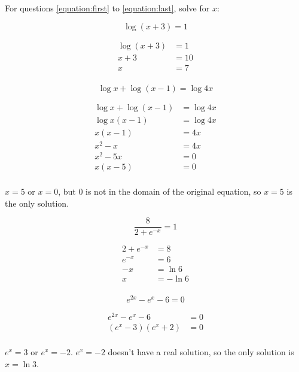\documentclass[fleqn,addpoints]{exam}
\begin{document}
\begin{questions}
For questions \ref{equation:first} to \ref{equation:last}, solve for $x$:

\question[5]
\label{equation:first}
\[
  \log(x+3) = 1
\]
\begin{solution}[2 cm]

\begin{align*}
  \log(x+3) &= 1 \\
  x + 3 &= 10 \\
  x &= 7 \\
\end{align*}

\end{solution}

\question[7]
\[
  \log x + \log (x-1) = \log 4x
\]
\begin{solution}[3 cm]
\begin{align*}
  \log x + \log (x-1) &= \log 4x \\
  \log x(x-1) &= \log 4x \\
  x(x-1) &= 4x \\
  x^2-x &= 4x \\
  x^2-5x &= 0 \\
  x(x-5) &= 0 \\
\end{align*}

$x=5$ or $x=0$, but 0 is not in the domain of the original equation, so $x=5$ is the only solution.

\end{solution}

\question[8]
\[ 
  \frac{8}{2+e^{-x}} = 1
\]
\begin{solution}[4 cm]
\begin{align*}
  2+e^{-x} &= 8 \\ 
  e^{-x} &= 6 \\
  -x &= \ln 6 \\
  x &= -\ln 6 \\
\end{align*}

\end{solution}

\question[10]
\label{equation:last}
\[
  e^{2x} - e^x - 6 = 0
\]
\begin{solution}[4 cm]
\begin{align*}
  e^{2x} - e^x - 6 &= 0 \\
  (e^x - 3)(e^x + 2) &= 0 \\
\end{align*}

$e^x = 3$ or $e^x = -2$.  $e^x = -2$ doesn't have a real solution, so the only solution is $x = \ln 3$.


\end{solution}
\end{questions}
\end{document}
